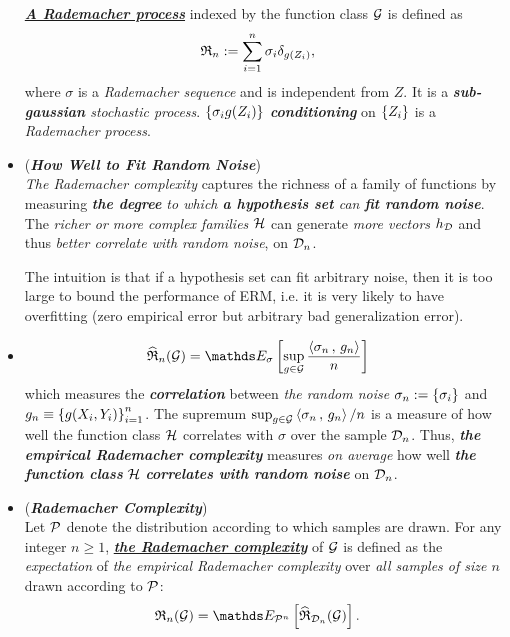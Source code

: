 \documentclass[11pt]{article}
\begin{document}
\begin{itemize}
\begin{definition}
\underline{\emph{\textbf{A Rademacher process}}} indexed by the function class ${\mathcal G}$ is defined as
\begin{align*}
{\mathfrak R}_n &:= \sum_{i=1}^n\sigma_i \delta_{g(Z_i)},
\end{align*} where $\sigma$ is a \emph{Rademacher sequence} and is independent from $Z$. It  is a \emph{\textbf{sub-gaussian} stochastic process}. $\left\{\sigma_i g(Z_i)\right\}$ \emph{\textbf{conditioning}} on $\left\{Z_i\right\}$ is a \emph{Rademacher process}.
\end{definition}

\item \begin{remark} (\emph{\textbf{How Well to Fit Random Noise}})\\
\emph{The Rademacher complexity} captures the richness of a family of functions by measuring \emph{\textbf{the degree} to which \textbf{a hypothesis set} can \textbf{fit random noise}}. The \emph{richer or more complex families} ${\mathcal H}$ can generate \emph{more vectors} $h_{{\mathcal D}}$ and thus \emph{better correlate with random noise}, on ${\mathcal D}_n$.

The intuition is that if a hypothesis set can fit arbitrary noise, then it is too large to bound the performance of ERM, i.e. it is very likely to have overfitting (zero empirical error but arbitrary bad generalization error).
\end{remark}

\item \begin{remark}
\begin{align*}
\widehat{\mathfrak{R}}_{n}(\cG)&= \E{\sigma}{\sup_{g \in \cG}\frac{\inn{\sigma_n}{g_{n}}}{n}}
\end{align*} which measures the \emph{\textbf{correlation}} between \emph{the random noise} $\sigma_n := \left\{\sigma_i\right\}$ and $g_n \equiv  \left\{g(X_i, Y_i)\right\}_{i=1}^{n}$. The supremum $\sup_{g \in {\mathcal G}} \left\langle \sigma_n\,,\, g_{n} \right\rangle/n$ is a measure of how well the function class ${\mathcal H}$ correlates with $\sigma$ over the sample ${\mathcal D}_n$. Thus, \emph{\textbf{the empirical Rademacher complexity}} measures \emph{on average} how well \emph{\textbf{the function class}} ${\mathcal H}$ \emph{\textbf{correlates with random noise}} on ${\mathcal D}_n$. 
\end{remark}




\item \begin{definition} (\emph{\textbf{Rademacher Complexity}})\\
Let ${\mathcal P}$ denote the distribution according to which samples are drawn. For any integer $n \ge 1$, \underline{\emph{\textbf{the Rademacher complexity}}} of ${\mathcal G}$ is defined as the \emph{expectation} of \emph{the empirical
Rademacher complexity} over \emph{all samples of size $n$} drawn according to ${\mathcal P}$:
\begin{align*}
\frR_{n}(\cG) &= \E{\cP^{n}}{\widehat{\mathfrak{R}}_{\cD_n}(\cG)}.
\end{align*}
\end{definition}


\end{itemize}
\end{document}
